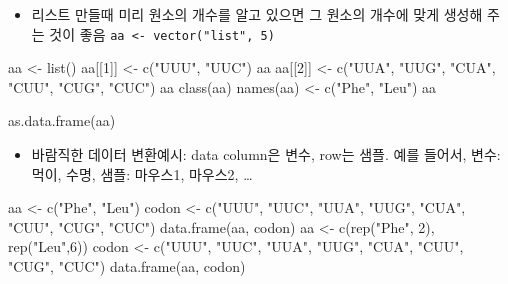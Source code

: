 \documentclass[
]{book}
\newenvironment{Shaded}{\begin{snugshade}}{\end{snugshade}}
\newcommand{\DecValTok}[1]{\textcolor[rgb]{0.00,0.00,0.81}{#1}}
\newcommand{\FunctionTok}[1]{\textcolor[rgb]{0.00,0.00,0.00}{#1}}
\newcommand{\NormalTok}[1]{#1}
\newcommand{\OtherTok}[1]{\textcolor[rgb]{0.56,0.35,0.01}{#1}}
\newcommand{\StringTok}[1]{\textcolor[rgb]{0.31,0.60,0.02}{#1}}
\providecommand{\tightlist}{%
  \setlength{\itemsep}{0pt}\setlength{\parskip}{0pt}}
\begin{document}
\begin{itemize}
\tightlist
\item
  리스트 만들때 미리 원소의 개수를 알고 있으면 그 원소의 개수에 맞게 생성해 주는 것이 좋음 \texttt{aa\ \textless{}-\ vector("list",\ 5)}
\end{itemize}

\begin{Shaded}
\begin{Highlighting}[]
\NormalTok{aa }\OtherTok{\textless{}{-}} \FunctionTok{list}\NormalTok{()}
\NormalTok{aa[[}\DecValTok{1}\NormalTok{]] }\OtherTok{\textless{}{-}} \FunctionTok{c}\NormalTok{(}\StringTok{"UUU"}\NormalTok{, }\StringTok{"UUC"}\NormalTok{)}
\NormalTok{aa}
\NormalTok{aa[[}\DecValTok{2}\NormalTok{]] }\OtherTok{\textless{}{-}} \FunctionTok{c}\NormalTok{(}\StringTok{"UUA"}\NormalTok{, }\StringTok{"UUG"}\NormalTok{, }\StringTok{"CUA"}\NormalTok{, }\StringTok{"CUU"}\NormalTok{, }\StringTok{"CUG"}\NormalTok{, }\StringTok{"CUC"}\NormalTok{)}
\NormalTok{aa}
\FunctionTok{class}\NormalTok{(aa)}
\FunctionTok{names}\NormalTok{(aa) }\OtherTok{\textless{}{-}} \FunctionTok{c}\NormalTok{(}\StringTok{"Phe"}\NormalTok{, }\StringTok{"Leu"}\NormalTok{)}
\NormalTok{aa}

\FunctionTok{as.data.frame}\NormalTok{(aa)}
\end{Highlighting}
\end{Shaded}

\begin{itemize}
\tightlist
\item
  바람직한 데이터 변환예시: data column은 변수, row는 샘플. 예를 들어서, 변수:먹이, 수명, 샘플: 마우스1, 마우스2, \ldots{}
\end{itemize}

\begin{Shaded}
\begin{Highlighting}[]
\NormalTok{aa }\OtherTok{\textless{}{-}} \FunctionTok{c}\NormalTok{(}\StringTok{"Phe"}\NormalTok{, }\StringTok{"Leu"}\NormalTok{)}
\NormalTok{codon }\OtherTok{\textless{}{-}} \FunctionTok{c}\NormalTok{(}\StringTok{"UUU"}\NormalTok{, }\StringTok{"UUC"}\NormalTok{, }\StringTok{"UUA"}\NormalTok{, }\StringTok{"UUG"}\NormalTok{, }\StringTok{"CUA"}\NormalTok{, }\StringTok{"CUU"}\NormalTok{, }\StringTok{"CUG"}\NormalTok{, }\StringTok{"CUC"}\NormalTok{)}
\FunctionTok{data.frame}\NormalTok{(aa, codon)}
\NormalTok{aa }\OtherTok{\textless{}{-}} \FunctionTok{c}\NormalTok{(}\FunctionTok{rep}\NormalTok{(}\StringTok{"Phe"}\NormalTok{, }\DecValTok{2}\NormalTok{), }\FunctionTok{rep}\NormalTok{(}\StringTok{"Leu"}\NormalTok{,}\DecValTok{6}\NormalTok{))}
\NormalTok{codon }\OtherTok{\textless{}{-}} \FunctionTok{c}\NormalTok{(}\StringTok{"UUU"}\NormalTok{, }\StringTok{"UUC"}\NormalTok{, }\StringTok{"UUA"}\NormalTok{, }\StringTok{"UUG"}\NormalTok{, }\StringTok{"CUA"}\NormalTok{, }\StringTok{"CUU"}\NormalTok{, }\StringTok{"CUG"}\NormalTok{, }\StringTok{"CUC"}\NormalTok{)}
\FunctionTok{data.frame}\NormalTok{(aa, codon)}
\end{Highlighting}
\end{Shaded}
\end{document}
